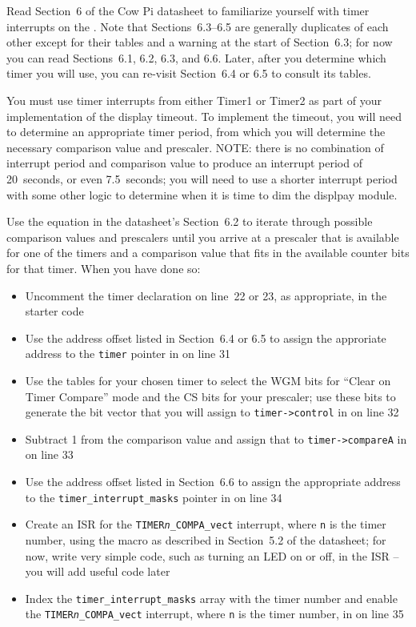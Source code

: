 Read Section~6 of the Cow Pi datasheet to familiarize yourself with timer interrupts on the \developmentboard.
Note that Sections~6.3--6.5 are generally duplicates of each other except for their tables and a warning at the start of Section~6.3;
for now you can read Sections~6.1, 6.2, 6.3, and 6.6.
Later, after you determine which timer you will use, you can re-visit Section~6.4 or 6.5 to consult its tables.

You must use timer interrupts from either Timer1 or Timer2 as part of your
implementation of the display timeout.
To implement the timeout, you will need to determine an appropriate timer period, from which you will determine the necessary comparison value and prescaler.
NOTE: there is no combination of interrupt period and comparison value to produce an interrupt period of 20~seconds, or even 7.5~seconds; you will need to use a shorter interrupt period with some other logic to determine when it is time to dim the displpay module.

Use the equation in the datasheet's Section~6.2 to iterate through possible comparison values and prescalers until you arrive at a prescaler that is available for one of the timers and a comparison value that fits in the available counter bits for that timer. When you have done so:
\begin{itemize}
    \item Uncomment the timer declaration on line~22 or 23, as appropriate, in the starter code
    \item Use the address offset listed in Section~6.4 or 6.5 to assign the approriate address to the \lstinline{timer} pointer in  on line 31
    \item Use the tables for your chosen timer to select the WGM bits for ``Clear on Timer Compare'' mode and the CS bits for your prescaler;
        use these bits to generate the bit vector that you will assign to \lstinline{timer->control} in  on line 32
    \item Subtract 1 from the comparison value and assign that to \lstinline{timer->compareA} in  on line 33
    \item Use the address offset listed in Section~6.6 to assign the appropriate address to the \lstinline{timer_interrupt_masks} pointer in  on line 34
    \item Create an ISR for the \texttt{TIMER\textit{n}\_COMPA\_vect} interrupt, where \texttt{n} is the timer number, using the  macro as described in Section~5.2 of the datasheet;
        for now, write very simple code, such as turning an LED on or off, in the ISR --
        you will add useful code later
    \item Index the \lstinline{timer_interrupt_masks} array with the timer number and enable the \texttt{TIMER\textit{n}\_COMPA\_vect} interrupt, where \texttt{n} is the timer number, in  on line 35
\end{itemize}

